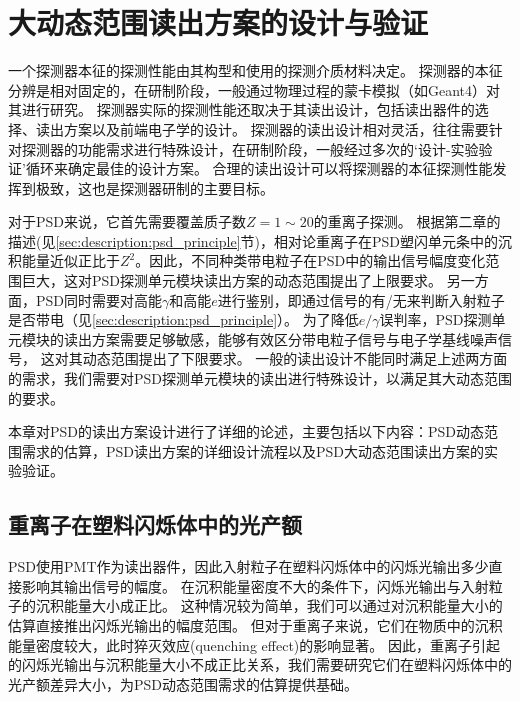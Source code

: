 \chapter{大动态范围读出方案的设计与验证}
\label{ch:large_dynmaicrange}
一个探测器本征的探测性能由其构型和使用的探测介质材料决定。
探测器的本征分辨是相对固定的，在研制阶段，一般通过物理过程的蒙卡模拟（如Geant4）对其进行研究。
探测器实际的探测性能还取决于其读出设计，包括读出器件的选择、读出方案以及前端电子学的设计。
探测器的读出设计相对灵活，往往需要针对探测器的功能需求进行特殊设计，在研制阶段，一般经过多次的‘设计-实验验证’循环来确定最佳的设计方案。
合理的读出设计可以将探测器的本征探测性能发挥到极致，这也是探测器研制的主要目标。

对于PSD来说，它首先需要覆盖质子数$Z=1 \sim 20$的重离子探测。
根据第二章的描述(见\ref{sec:description:psd_principle}节)，相对论重离子在PSD塑闪单元条中的沉积能量近似正比于$Z^2$。因此，不同种类带电粒子在PSD中的输出信号幅度变化范围巨大，这对PSD探测单元模块读出方案的动态范围提出了上限要求。
另一方面，PSD同时需要对高能$\gamma$和高能$e$进行鉴别，即通过信号的有/无来判断入射粒子是否带电（见\ref{sec:description:psd_principle}）。
为了降低$e/\gamma$误判率，PSD探测单元模块的读出方案需要足够敏感，能够有效区分带电粒子信号与电子学基线噪声信号，
这对其动态范围提出了下限要求。
一般的读出设计不能同时满足上述两方面的需求，我们需要对PSD探测单元模块的读出进行特殊设计，以满足其大动态范围的要求。

本章对PSD的读出方案设计进行了详细的论述，主要包括以下内容：PSD动态范围需求的估算，PSD读出方案的详细设计流程以及PSD大动态范围读出方案的实验验证。


\section{重离子在塑料闪烁体中的光产额}
\label{sec:dynamic_range:light_yield}
PSD使用PMT作为读出器件，因此入射粒子在塑料闪烁体中的闪烁光输出多少直接影响其输出信号的幅度。
在沉积能量密度不大的条件下，闪烁光输出与入射粒子的沉积能量大小成正比。
这种情况较为简单，我们可以通过对沉积能量大小的估算直接推出闪烁光输出的幅度范围。
但对于重离子来说，它们在物质中的沉积能量密度较大，此时猝灭效应\parencite{birks_book_2013}(quenching effect)的影响显著。
因此，重离子引起的闪烁光输出与沉积能量大小不成正比关系，我们需要研究它们在塑料闪烁体中的光产额差异大小，为PSD动态范围需求的估算提供基础。

